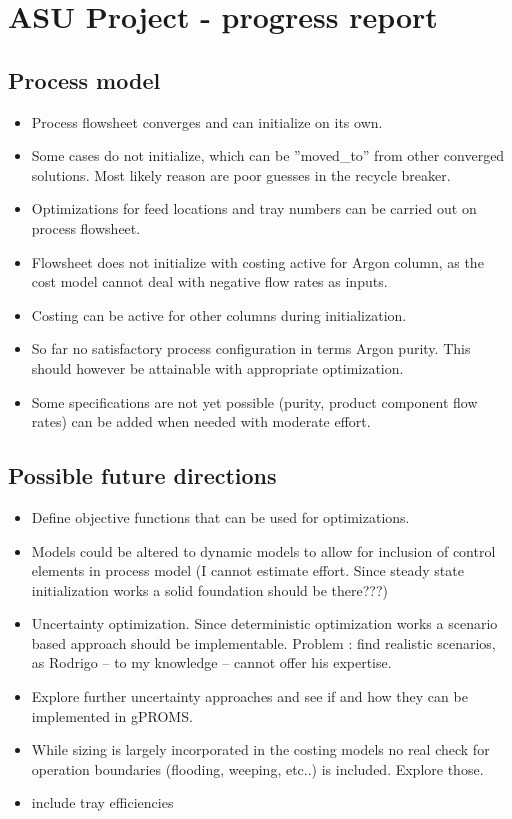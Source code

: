 
\chapter*{ASU Project - progress report}

\section*{Process model}
\begin{itemize}
    \item Process flowsheet converges and can initialize on its own. 
    \item Some cases do not initialize, which can be ''moved\_to'' from other converged solutions. Most likely reason are poor guesses in the recycle breaker.
    \item Optimizations for feed locations and tray numbers can be carried out on process flowsheet. 
    \item Flowsheet does not initialize with costing active for Argon column, as the cost model cannot deal with negative flow rates as inputs. 
    \item Costing can be active for other columns during initialization. 
    \item So far no satisfactory process configuration in terms Argon purity. This should however be attainable with appropriate optimization.
    \item Some specifications are not yet possible (purity, product component flow rates) can be added when needed with moderate effort. 
\end{itemize} 

\section*{Possible future directions}
\begin{itemize}
    \item Define objective functions that can be used for optimizations. 
    \item Models could be altered to dynamic models to allow for inclusion of control elements in process model (I cannot estimate effort. Since steady state initialization works a solid foundation should be there???)
    \item Uncertainty optimization. Since deterministic optimization works a scenario based approach should be implementable. Problem : find realistic scenarios, as Rodrigo -- to my knowledge -- cannot offer his expertise. 
    \item Explore further uncertainty approaches and see if and how they can be implemented in gPROMS. 
    \item While sizing is largely incorporated in the costing models no real check for operation boundaries (flooding, weeping, etc..) is included. Explore those. 
    \item include tray efficiencies 
\end{itemize}